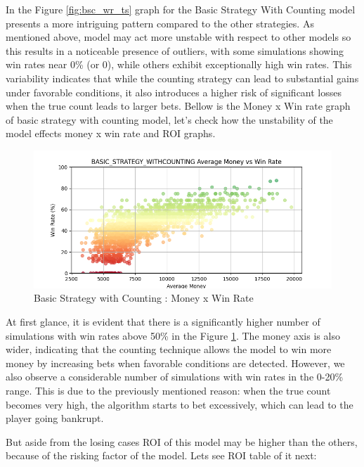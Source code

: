 \documentclass[a4paper,12pt]{report}
\begin{document}
In the Figure \ref{fig:bsc_wr_ts} graph for the Basic Strategy With Counting model presents a more intriguing pattern compared to the other strategies. As mentioned above, model may act more unstable with respect to other models so this results in a noticeable presence of outliers, with some simulations showing win rates near 0\% (or 0), while others exhibit exceptionally high win rates. This variability indicates that while the counting strategy can lead to substantial gains under favorable conditions, it also introduces a higher risk of significant losses when the true count leads to larger bets. Bellow is the Money x Win rate graph of basic strategy with counting model, let's check how the unstability of the model effects money x win rate and ROI graphs.

\begin{figure}[h]
\begin{center}
\includegraphics[scale=0.6]{figures/graphs/bsc_money_wr_big.png}
\end{center}
\caption{Basic Strategy with Counting : Money x Win Rate}
\label{fig:bsc_wr}
\end{figure}

At first glance, it is evident that there is a significantly higher number of simulations with win rates above 50\% in the Figure \ref{fig:bsc_wr}. The money axis is also wider, indicating that the counting technique allows the model to win more money by increasing bets when favorable conditions are detected. However, we also observe a considerable number of simulations with win rates in the 0-20\% range. This is due to the previously mentioned reason: when the true count becomes very high, the algorithm starts to bet excessively, which can lead to the player going bankrupt.

But aside from the losing cases ROI of this model may be higher than the others, because of the risking factor of the model. Lets see ROI table of it next:
\end{document}
